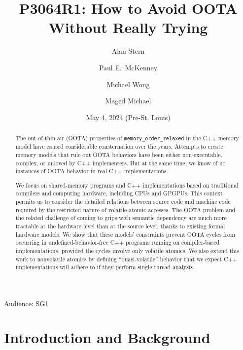 \documentclass[10]{article}
\begin{document}
\title{P3064R1: How to Avoid OOTA Without Really Trying}

\newcommand{\co}[1]{\lstinline[breaklines=yes,breakatwhitespace=yes]{#1}}

\author{
Alan Stern\\{\small {}} \and
Paul E.~McKenney\\{\small {}} \and
Michael Wong\\{\small {}} \and
Maged Michael\\{\small {}}
}
\date{May 4, 2024 (Pre-St. Louis)}
\maketitle{}

Audience: SG1

\begin{abstract}
	The out-of-thin-air (OOTA) properties
	of \co{memory_order_relaxed} in the C++ memory model
	have caused considerable consternation over the years.
	Attempts to create memory models that rule out OOTA behaviors
	have been either non-executable, complex, or unloved by C++
	implementers.
	But at the same time, we know of no instances of OOTA behavior
	in real C++ implementations.

	We focus on shared-memory programs and
	C++ implementations based on traditional compilers and
	computing hardware, including CPUs and GPGPUs.
	This context permits us to consider the detailed relations
	between source code and machine code required by the restricted
	nature of volatile atomic accesses.
	The OOTA problem and the related challenge of coming to grips
	with semantic dependency are much more tractable at the hardware
	level than at the source level, thanks to existing formal
	hardware models.
	We show that these models' constraints prevent OOTA cycles
	from occurring in undefined-behavior-free C++ programs running
	on compiler-based implementations, provided the cycles involve
	only volatile atomics.
	We also extend this work to nonvolatile atomics by defining
	``quasi-volatile'' behavior that we expect C++ implementations
	will adhere to if they perform single-thread analysis.
\end{abstract}

\pagebreak

\tableofcontents

\pagebreak

\section{Introduction and Background}
\label{sec:Introduction}
\end{document}
